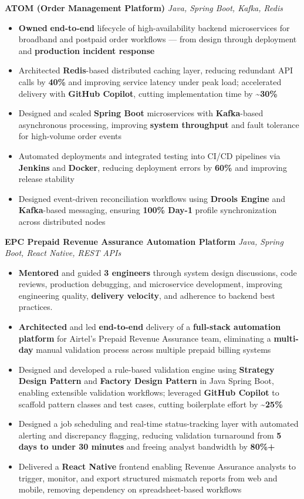 \documentclass[letterpaper,11pt]{article}
\newcommand{\resumeItem}[1]{
  \item\small{{#1 \vspace{-2pt}}}
}
\newcommand{\resumeItemListStart}{\begin{itemize}}
\newcommand{\resumeItemListEnd}{\end{itemize}\vspace{-5pt}}
\begin{document}
      \vspace{4pt}
      \textbf{\small ATOM (Order Management Platform)} \hfill \textit{\small Java, Spring Boot, Kafka, Redis} \\
      \vspace{-2pt}
      \resumeItemListStart
        \resumeItem{\textbf{Owned} \textbf{end-to-end} lifecycle of high-availability backend microservices for broadband and postpaid order workflows — from design through deployment and \textbf{production incident response}}
        \resumeItem{Architected \textbf{Redis}-based distributed caching layer, reducing redundant API calls by \textbf{40\%} and improving service latency under peak load; accelerated delivery with \textbf{GitHub Copilot}, cutting implementation time by \textbf{\textasciitilde{}30\%}}
        \resumeItem{Designed and scaled \textbf{Spring Boot} microservices with \textbf{Kafka}-based asynchronous processing, improving \textbf{system throughput} and fault tolerance for high-volume order events}
        \resumeItem{Automated deployments and integrated testing into CI/CD pipelines via \textbf{Jenkins} and \textbf{Docker}, reducing deployment errors by \textbf{60\%} and improving release stability}
        \resumeItem{Designed event-driven reconciliation workflows using \textbf{Drools Engine} and \textbf{Kafka}-based messaging, ensuring \textbf{100\% Day-1} profile synchronization across distributed nodes}
      \resumeItemListEnd

      \vspace{4pt}
      \textbf{\small EPC Prepaid Revenue Assurance Automation Platform} \hfill \textit{\small Java, Spring Boot, React Native, REST APIs} \\
      \vspace{-2pt}
      \resumeItemListStart
        \resumeItem{\textbf{Mentored} and guided \textbf{3 engineers} through system design discussions, code reviews, production debugging, and microservice development, improving engineering quality, \textbf{delivery velocity}, and adherence to backend best practices.}
        \resumeItem{\textbf{Architected} and led \textbf{end-to-end} delivery of a \textbf{full-stack automation platform} for Airtel's Prepaid Revenue Assurance team, eliminating a \textbf{multi-day} manual validation process across multiple prepaid billing systems}
        \resumeItem{Designed and developed a rule-based validation engine using \textbf{Strategy Design Pattern} and \textbf{Factory Design Pattern} in Java Spring Boot, enabling extensible validation workflows; leveraged \textbf{GitHub Copilot} to scaffold pattern classes and test cases, cutting boilerplate effort by \textbf{\textasciitilde{}25\%}}
        \resumeItem{Designed a job scheduling and real-time status-tracking layer with automated alerting and discrepancy flagging, reducing validation turnaround from \textbf{5 days to under 30 minutes} and freeing analyst bandwidth by \textbf{80\%+}}
        \resumeItem{Delivered a \textbf{React Native} frontend enabling Revenue Assurance analysts to trigger, monitor, and export structured mismatch reports from web and mobile, removing dependency on spreadsheet-based workflows}
      \resumeItemListEnd
\end{document}
